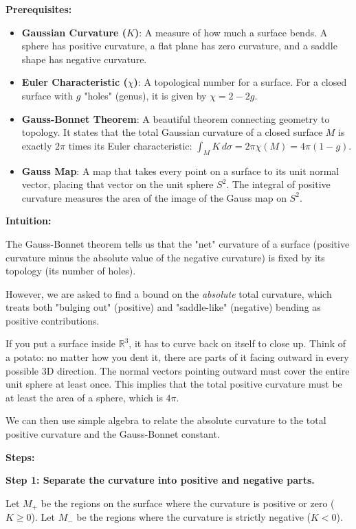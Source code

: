 \begin{solution}
\textbf{Prerequisites:}
\begin{itemize}
    \item \textbf{Gaussian Curvature ($K$)}: A measure of how much a surface bends. A sphere has positive curvature, a flat plane has zero curvature, and a saddle shape has negative curvature.
    \item \textbf{Euler Characteristic ($\chi$)}: A topological number for a surface. For a closed surface with $g$ "holes" (genus), it is given by $\chi = 2 - 2g$.
    \item \textbf{Gauss-Bonnet Theorem}: A beautiful theorem connecting geometry to topology. It states that the total Gaussian curvature of a closed surface $M$ is exactly $2\pi$ times its Euler characteristic: $\int_M K \, d\sigma = 2\pi \chi(M) = 4\pi(1 - g)$.
    \item \textbf{Gauss Map}: A map that takes every point on a surface to its unit normal vector, placing that vector on the unit sphere $S^2$. The integral of positive curvature measures the area of the image of the Gauss map on $S^2$.
\end{itemize}

\textbf{Intuition:}

The Gauss-Bonnet theorem tells us that the "net" curvature of a surface (positive curvature minus the absolute value of the negative curvature) is fixed by its topology (its number of holes). 

However, we are asked to find a bound on the \textit{absolute} total curvature, which treats both "bulging out" (positive) and "saddle-like" (negative) bending as positive contributions. 

If you put a surface inside $\mathbb{R}^3$, it has to curve back on itself to close up. Think of a potato: no matter how you dent it, there are parts of it facing outward in every possible 3D direction. The normal vectors pointing outward must cover the entire unit sphere at least once. This implies that the total positive curvature must be at least the area of a sphere, which is $4\pi$. 

We can then use simple algebra to relate the absolute curvature to the total positive curvature and the Gauss-Bonnet constant.

\textbf{Steps:}

\textbf{Step 1: Separate the curvature into positive and negative parts.}

Let $M_+$ be the regions on the surface where the curvature is positive or zero ($K \geq 0$).
Let $M_-$ be the regions where the curvature is strictly negative ($K < 0$).


\end{solution}

